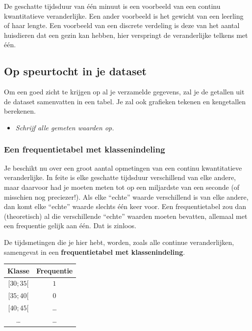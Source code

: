 \documentclass[11pt]{article}
\newcommand{\vraag}[2]{\begin{itemize}\item {\it #1} \vspace*{#2}\end{itemize}}
\begin{document}
De geschatte tijdsduur van één minuut is een voorbeeld van een continu kwantitatieve veranderlijke.
Een ander voorbeeld is het gewicht van een leerling of haar lengte.  Een voorbeeld van een discrete verdeling is deze van het aantal huisdieren dat een gezin kan hebben, hier verspringt de veranderlijke telkens met één.

\subsection{Op speurtocht in je dataset}

Om een goed zicht te krijgen op al je verzamelde gegevens, zal je de
getallen uit de dataset samenvatten in een tabel. Je zal ook grafieken
tekenen en kengetallen berekenen.

\vraag{Schrijf alle gemeten waarden op.}{5cm}


\subsubsection{Een frequentietabel met klassenindeling}

Je beschikt nu over een groot aantal opmetingen van een continu kwantitatieve veranderlijke. In feite is
elke geschatte tijdsduur verschillend van elke andere, maar daarvoor had je moeten meten tot op een
miljardste van een seconde (of misschien nog preciezer!). Als elke “echte” waarde verschillend is
van elke andere, dan komt elke “echte” waarde slechts één keer voor. Een frequentietabel zou dan
(theoretisch) al die verschillende “echte” waarden moeten bevatten, allemaal met een frequentie
gelijk aan één. Dat is zinloos.

De tijdsmetingen die je hier hebt, worden, zoals alle continue veranderlijken, samengevat in een
{\bf frequentietabel met klassenindeling}.

\begin{center}
  \begin{tabular}{|c|c|}
    \hline
    Klasse & Frequentie\\
    \hline
    $[30;35[$ & $1$\\    
    \hline
    $[35;40[$ & $0$\\
    \hline
    $[40;45[$ & \ldots\\ 
    \hline
    \ldots & \ldots\\ 
    \hline
  \end{tabular}
\end{center}
\end{document}
